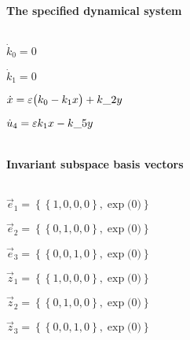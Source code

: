 \(\)
\paragraph{The specified dynamical system}
\(
\)\par

\(\dot k_0=0
\)\par

\(\dot k_1=0
\)\par
\(\dot x=\varepsilon \big(k_0-k_1 x\big)+k\_2 y
\)\par
\(\dot u_{4}=\varepsilon k_1 x-k\_5 y
\)\par
\(\)
\paragraph{Invariant subspace basis vectors}
\(
\)\par
\(\vec e_{1}=\left\{
\left\{
1 , 0 , 0 , 0
\right\} , \exp \big(0\big)
\right\}
\)\par
\(\vec e_{2}=\left\{
\left\{
0 , 1 , 0 , 0
\right\} , \exp \big(0\big)
\right\}
\)\par
\(\vec e_{3}=\left\{
\left\{
0 , 0 , 1 , 0
\right\} , \exp \big(0\big)
\right\}
\)\par
\(\vec z_{1}=\left\{
\left\{
1 , 0 , 0 , 0
\right\} , \exp \big(0\big)
\right\}
\)\par
\(\vec z_{2}=\left\{
\left\{
0 , 1 , 0 , 0
\right\} , \exp \big(0\big)
\right\}
\)\par
\(\vec z_{3}=\left\{
\left\{
0 , 0 , 1 , 0
\right\} , \exp \big(0\big)
\right\}
\)\par
